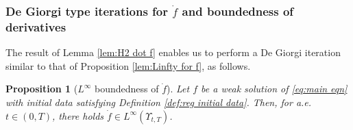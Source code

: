 \documentclass[11pt,a4paper,reqno]{amsart}
\newtheorem{prop}{Proposition}[section]
\theoremstyle{remark}
\theoremstyle{definition}
\numberwithin{equation}{section}
\begin{document}
 
  




\subsubsection{De Giorgi type iterations for $\dot{f}$ and boundedness of derivatives}\label{sec:moser dot f}

The result of Lemma \ref{lem:H2 dot f} enables us to perform a De Giorgi iteration similar to that of Proposition \ref{lem:Linfty for f}, as follows. 

\begin{prop}[$L^\infty$ boundedness of $\dot{f}$]\label{prop:Linfty for dot f}
   Let $f$ be a weak solution of \eqref{eq:main eqn} with initial data satisfying Definition \ref{def:reg initial data}. Then, for a.e.~$t \in (0,T)$, there holds $\dot{f} \in L^\infty(\Upsilon_{t,T})$. 
   \end{prop}
\end{document}
